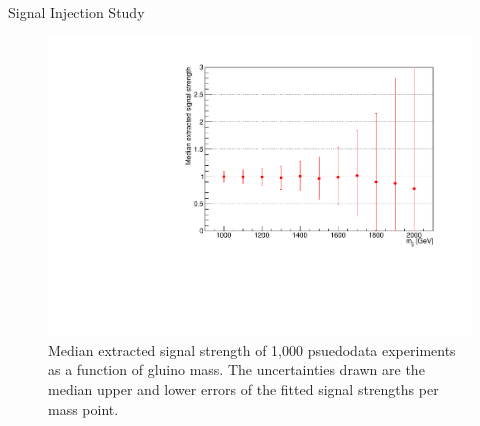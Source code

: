 \begin{subsection}{Signal Injection Study}
\begin{figure}[tbp!]
\centering
\includegraphics[angle=0,width=0.80\columnwidth]{fig/sig_injection.pdf}
\caption{Median extracted signal strength of 1,000 psuedodata experiments as a function of gluino mass.
The uncertainties drawn are the median upper and lower errors of the fitted signal strengths per mass point.}
\label{fig:sig_injection}
\end{figure}


\end{subsection}
